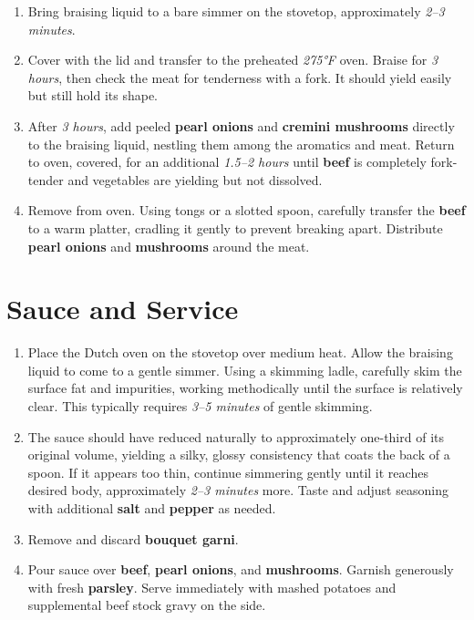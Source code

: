 \documentclass[11pt,letterpaper]{article}
\begin{document}
\begin{enumerate}
    \item Bring braising liquid to a bare simmer on the stovetop, approximately \textit{2--3 minutes}.
    
    \item Cover with the lid and transfer to the preheated \textit{275°F} oven. Braise for \textit{3 hours}, then check the meat for tenderness with a fork. It should yield easily but still hold its shape.
    
    \item After \textit{3 hours}, add peeled \textbf{pearl onions} and \textbf{cremini mushrooms} directly to the braising liquid, nestling them among the aromatics and meat. Return to oven, covered, for an additional \textit{1.5--2 hours} until \textbf{beef} is completely fork-tender and vegetables are yielding but not dissolved.
    
    \item Remove from oven. Using tongs or a slotted spoon, carefully transfer the \textbf{beef} to a warm platter, cradling it gently to prevent breaking apart. Distribute \textbf{pearl onions} and \textbf{mushrooms} around the meat.
\end{enumerate}

\section*{Sauce and Service}

\begin{enumerate}
    \item Place the Dutch oven on the stovetop over medium heat. Allow the braising liquid to come to a gentle simmer. Using a skimming ladle, carefully skim the surface fat and impurities, working methodically until the surface is relatively clear. This typically requires \textit{3--5 minutes} of gentle skimming.
    
    \item The sauce should have reduced naturally to approximately one-third of its original volume, yielding a silky, glossy consistency that coats the back of a spoon. If it appears too thin, continue simmering gently until it reaches desired body, approximately \textit{2--3 minutes} more. Taste and adjust seasoning with additional \textbf{salt} and \textbf{pepper} as needed.
    
    \item Remove and discard \textbf{bouquet garni}.
    
    \item Pour sauce over \textbf{beef}, \textbf{pearl onions}, and \textbf{mushrooms}. Garnish generously with fresh \textbf{parsley}. Serve immediately with mashed potatoes and supplemental beef stock gravy on the side.
\end{enumerate}
\end{document}
